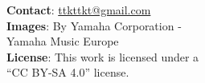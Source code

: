 \documentclass[a6paper, 12pt, parskip=half, DIV=14]{scrartcl}
\newcommand\blfootnote[1]{%
  \begingroup
  \renewcommand\thefootnote{}\footnote{#1}%
  \addtocounter{footnote}{-1}%
  \endgroup
}
\renewcommand{\thefootnote}{\fnsymbol{footnote}}
\begin{document}
\vfill

\textbf{Contact}: \href{mailto:ttkttkt@gmail.com}{ttkttkt@gmail.com}\\
\textbf{Images}: By Yamaha Corporation -\\Yamaha Music Europe\\
\textbf{License}: This work is licensed under a\\``CC BY-SA 4.0'' license.%
 \newpage
\phantom{Test Piece}
\end{document}

